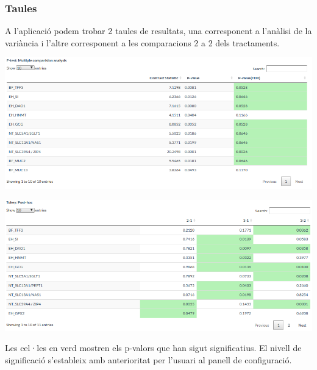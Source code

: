 \documentclass[english]{article}
\begin{document}
\subsubsection{Taules}
A l'aplicació podem trobar 2 taules de resultats, una corresponent a l'anàlisi de la variància i l'altre corresponent a les comparacions 2 a 2 dels tractaments.
\begin{center}
\includegraphics[scale=0.3]{app3.png}
\end{center}
\begin{center}
\includegraphics[scale=0.3]{app4.png}
\end{center}
Les cel·les en verd mostren els p-valors que han sigut significatius. El nivell de significació s'estableix amb anterioritat per l'usuari al panell de configuració.
\end{document}
